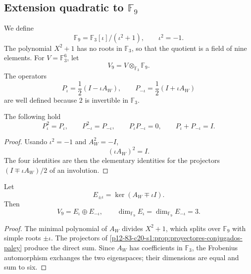 \subsection{Extension quadratic to \texorpdfstring{\(\mathbb F_9\)}{F₉}}

We define
\begin{equation}
 \mathbb F_9=\mathbb F_3[\iota]/(\iota^2+1),
 \qquad \iota^2=-1.
 \label{p12-83-c20-s1:eq:definicion-f9-autonoma}
\end{equation}
The polynomial \(X^2+1\) has no roots in \(\mathbb F_3\), so that the
quotient is a field of nine elements. For
\(V=\mathbb F_3^6\), let
\[
 V_9=V\otimes_{\mathbb F_3}\mathbb F_9.
\]
The operators
\begin{equation}
 P_\iota=\frac12(I-\iota A_W),
 \qquad
 P_{-\iota}=\frac12(I+\iota A_W)
 \label{p12-83-c20-s1:eq:proyectores-f9-paley}
\end{equation}
are well defined because \(2\) is invertible in \(\mathbb F_3\).

\begin{proposition}
\label{p12-83-c20-s1:prop:proyectores-conjugados-paley}
The following hold
\[
 P_\iota^2=P_\iota,
 \qquad
 P_{-\iota}^2=P_{-\iota},
 \qquad
 P_\iota P_{-\iota}=0,
 \qquad
 P_\iota+P_{-\iota}=I.
\]
\end{proposition}

\begin{proof}
Usando \(\iota^2=-1\) and \(A_W^2=-I\),
\[
 (\iota A_W)^2=I.
\]
The four identities are then the elementary identities for the projectors
\((I\mp\iota A_W)/2\) of an involution.
\end{proof}

\begin{theorem}
\label{p12-83-c20-s1:thm:descomposicion-espectral-f9-paley}
Let
\[
 E_{\pm\iota}=\ker(A_W\mp\iota I).
\]
Then
\begin{equation}
 V_9=E_\iota\oplus E_{-\iota},
 \qquad
 \dim_{\mathbb F_9}E_\iota
 =\dim_{\mathbb F_9}E_{-\iota}=3.
 \label{p12-83-c20-s1:eq:descomposicion-espectral-f9-paley}
\end{equation}
\end{theorem}

\begin{proof}
The minimal polynomial of \(A_W\) divides \(X^2+1\), which splits over
\(\mathbb F_9\) with simple roots \(\pm\iota\). The projectors of
\cref{p12-83-c20-s1:prop:proyectores-conjugados-paley} produce the direct sum. Since
\(A_W\) has coefficients in \(\mathbb F_3\), the Frobenius automorphism
exchanges the two eigenspaces; their dimensions are equal and
sum to six.
\end{proof}

